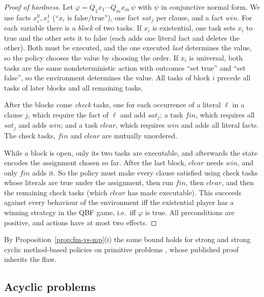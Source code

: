 \begin{proof}[Proof of hardness]
  Let $\varphi=Q_1x_1\cdots Q_mx_m\,\psi$ with $\psi$ in conjunctive normal form. We use facts
  $x_i^0,x_i^1$ (``$x_i$ is false/true''), one fact $\mathit{sat}_j$ per clause, and a fact
  $\mathit{win}$. For each variable there is a \emph{block} of two tasks. If $x_i$ is existential,
  one task sets $x_i$ to true and the other sets it to false (each adds one literal fact and deletes
  the other). Both must be executed, and the one executed \emph{last} determines the value, so the
  policy chooses the value by choosing the order. If $x_i$ is universal, both tasks are the same
  nondeterministic action with outcomes ``set true'' and ``set false'', so the environment
  determines the value. All tasks of block $i$ precede all tasks of later blocks and all remaining
  tasks.

  After the blocks come \emph{check} tasks, one for each occurrence of a literal $\ell$ in a clause
  $j$, which require the fact of $\ell$ and add $\mathit{sat}_j$; a task $\mathit{fin}$, which
  requires all $\mathit{sat}_j$ and adds $\mathit{win}$; and a task $\mathit{clear}$, which
  requires $\mathit{win}$ and adds all literal facts. The check tasks, $\mathit{fin}$ and
  $\mathit{clear}$ are mutually unordered.

  While a block is open, only its two tasks are executable, and afterwards the state encodes the
  assignment chosen so far. After the last block, $\mathit{clear}$ needs $\mathit{win}$, and only
  $\mathit{fin}$ adds it. So the policy must make every clause satisfied using check tasks whose
  literals are true under the assignment, then run $\mathit{fin}$, then $\mathit{clear}$, and then
  the remaining check tasks (which $\mathit{clear}$ has made executable). This succeeds against
  every behaviour of the environment iff the existential player has a winning strategy in the QBF
  game, i.e.\ iff $\varphi$ is true. All preconditions are positive, and actions have at most two
  effects.
\end{proof}

By Proposition~\ref{prop:fm-vs-mp}(i) the same bound holds for strong and strong cyclic
method-based policies on primitive problems \parencite[Cor.~1]{chen:bercher:icaps-22}, whose
published proof inherits the flaw.

\subsection{Acyclic problems}\label{sec:fixed-acyc}

